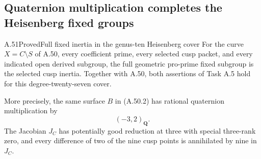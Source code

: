 \subsection{Quaternion multiplication completes the Heisenberg fixed groups}

\begin{statement}{A.51}{Proved}{Full fixed inertia in the genus-ten Heisenberg cover}
For the curve \(X=C\setminus S\) of A.50,
every coefficient prime, every selected cusp packet,
and every indicated open derived subgroup, the full
geometric pro-prime fixed subgroup is the selected
cusp inertia. Together with A.50, both assertions
of Task A.5 hold for this degree-twenty-seven cover.

More precisely, the same surface \(B\) in
(A.50.2) has rational quaternion multiplication by
\[
                         (-3,2)_{\mathbf Q}.
                                                               \tag{A.51.1}
\]
The Jacobian \(J_C\) has potentially good
reduction at three with special three-rank zero,
and every difference of two of the nine cusp
points is annihilated by nine in \(J_C\).
\end{statement}

